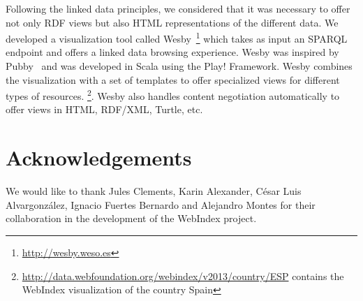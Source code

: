 \documentclass{llncs}
\begin{document}
Following the linked data principles, we considered that it was necessary to offer not only RDF views but also HTML representations of the different data.
We developed a visualization tool called Wesby~\footnote{\url{http://wesby.weso.es}} which takes as input an SPARQL endpoint and offers a linked data browsing experience. Wesby was inspired by Pubby~\cite{Pubby} and was developed in Scala using the Play! Framework. 
Wesby combines the visualization with a set of templates to offer specialized views for different
 types of resources. \footnote{\url{http://data.webfoundation.org/webindex/v2013/country/ESP} contains the WebIndex visualization of 
 the country Spain}. Wesby also handles content negotiation automatically to offer views in HTML, RDF/XML, Turtle, etc.

\section{Acknowledgements}

We would like to thank Jules Clements, Karin Alexander, César Luis Alvargonzález, Ignacio Fuertes Bernardo and Alejandro Montes for their collaboration in the development of the WebIndex project.

%
%
\end{document}
